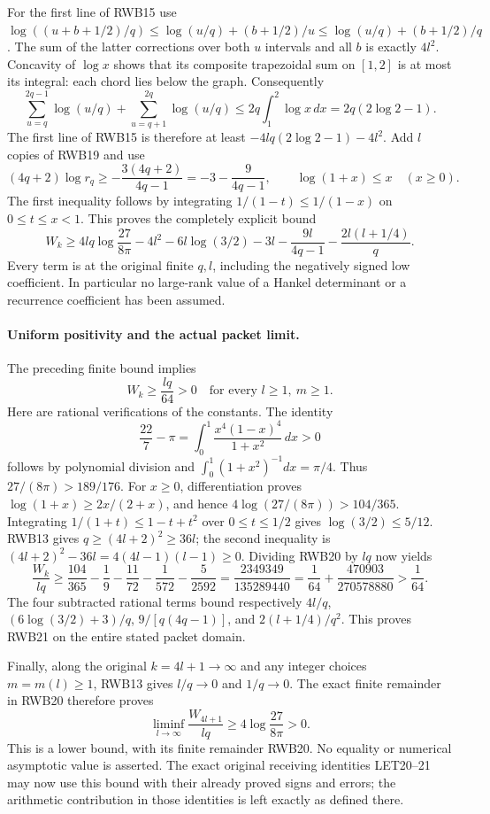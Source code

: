 \documentclass[11pt,a4paper]{article}
\begin{document}
For the first line of RWB15 use
$\log((u+b+1/2)/q)\le\log(u/q)+(b+1/2)/u
\le\log(u/q)+(b+1/2)/q$. The sum of the latter corrections over
both $u$ intervals and all $b$ is exactly $4l^2$.
Concavity of $\log x$ shows that its composite trapezoidal sum on
$[1,2]$ is at most its integral: each chord lies below the graph.
Consequently
\[
 \sum_{u=q}^{2q-1}\log(u/q)+\sum_{u=q+1}^{2q}\log(u/q)
 \le2q\int_1^2\log x\,dx=2q(2\log2-1).
\]
The first line of RWB15 is therefore at least
$-4lq(2\log2-1)-4l^2$. Add $l$ copies of RWB19 and use
\[
 (4q+2)\log r_q\ge-\frac{3(4q+2)}{4q-1}
 =-3-\frac9{4q-1},\qquad
 \log(1+x)\le x\quad(x\ge0).
\]
The first inequality follows by integrating
$1/(1-t)\le1/(1-x)$ on $0\le t\le x<1$.
This proves the completely explicit bound
\[
 \boxed{\displaystyle
 W_k\ge4lq\log\frac{27}{8\pi}
       -4l^2-6l\log(3/2)-3l
       -\frac{9l}{4q-1}-\frac{2l(l+1/4)}q.}
 \tag{RWB20}
\]
Every term is at the original finite $q,l$, including the negatively
signed low coefficient. In particular no large-rank value of a Hankel
determinant or a recurrence coefficient has been assumed.

\paragraph{Uniform positivity and the actual packet limit.}
The preceding finite bound implies
\[
 \boxed{\displaystyle W_k\ge\frac{lq}{64}>0
 \quad\text{for every }l\ge1,\ m\ge1.}
 \tag{RWB21}
\]
Here are rational verifications of the constants. The identity
\[
 \frac{22}{7}-\pi=\int_0^1
                \frac{x^4(1-x)^4}{1+x^2}\,dx>0
\]
follows by polynomial division and $\int_0^1(1+x^2)^{-1}dx=\pi/4$.
Thus $27/(8\pi)>189/176$. For $x\ge0$, differentiation proves
$\log(1+x)\ge2x/(2+x)$, and hence
$4\log(27/(8\pi))>104/365$. Integrating
$1/(1+t)\le1-t+t^2$ over $0\le t\le1/2$ gives
$\log(3/2)\le5/12$.
RWB13 gives $q\ge(4l+2)^2\ge36l$; the second inequality is
$(4l+2)^2-36l=4(4l-1)(l-1)\ge0$. Dividing RWB20 by $lq$ now yields
\[
 \frac{W_k}{lq}\ge
 \frac{104}{365}-\frac19-\frac{11}{72}-\frac1{572}
                    -\frac5{2592}
 =\frac{2349349}{135289440}
 =\frac1{64}+\frac{470903}{270578880}>\frac1{64}.
 \tag{RWB22}
\]
The four subtracted rational terms bound respectively
$4l/q$, $(6\log(3/2)+3)/q$, $9/[q(4q-1)]$, and
$2(l+1/4)/q^2$. This proves RWB21 on the entire stated packet domain.

Finally, along the original $k=4l+1\to\infty$ and any integer choices
$m=m(l)\ge1$, RWB13 gives $l/q\to0$ and $1/q\to0$.
The exact finite remainder in RWB20 therefore proves
\[
 \boxed{\displaystyle
 \liminf_{l\to\infty}\frac{W_{4l+1}}{lq}
 \ge4\log\frac{27}{8\pi}>0.}
 \tag{RWB23}
\]
This is a lower bound, with its finite remainder RWB20. No equality
or numerical asymptotic value is asserted. The exact original receiving
identities LET20--21 may now use this bound with their already proved
signs and errors; the arithmetic contribution in those identities is
left exactly as defined there.
\end{document}
